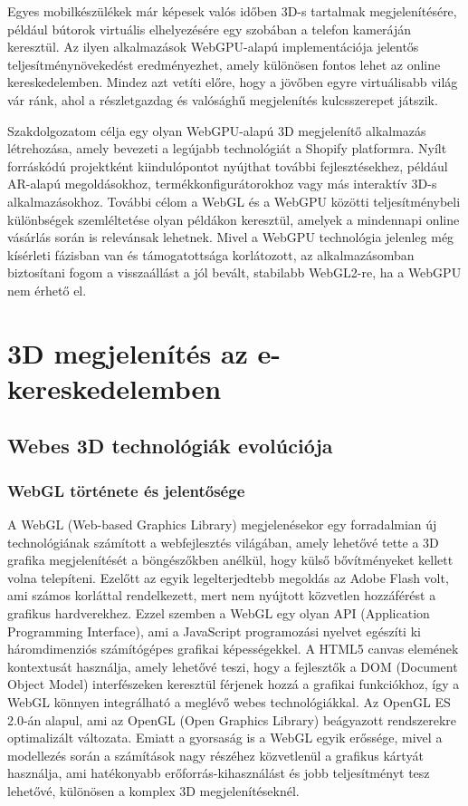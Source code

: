 \documentclass[12pt]{report}
\begin{document}
        Egyes mobilkészülékek már képesek valós időben 3D-s tartalmak megjelenítésére, például bútorok virtuális elhelyezésére egy szobában a telefon kameráján keresztül. Az ilyen alkalmazások WebGPU-alapú implementációja jelentős teljesítménynövekedést eredményezhet, amely különösen fontos lehet az online kereskedelemben. Mindez azt vetíti előre, hogy a jövőben egyre virtuálisabb világ vár ránk, ahol a részletgazdag és valósághű megjelenítés kulcsszerepet játszik.
        
        Szakdolgozatom célja egy olyan WebGPU-alapú 3D megjelenítő alkalmazás létrehozása, amely bevezeti a legújabb technológiát a Shopify platformra. Nyílt forráskódú projektként kiindulópontot nyújthat további fejlesztésekhez, például AR-alapú megoldásokhoz, termékkonfigurátorokhoz vagy más interaktív 3D-s alkalmazásokhoz. További célom a WebGL és a WebGPU közötti teljesítménybeli különbségek szemléltetése olyan példákon keresztül, amelyek a mindennapi online vásárlás során is relevánsak lehetnek. Mivel a WebGPU technológia jelenleg még kísérleti fázisban van és támogatottsága korlátozott, az alkalmazásomban biztosítani fogom a visszaállást a jól bevált, stabilabb WebGL2-re, ha a WebGPU nem érhető el.
        
	\chapter{3D megjelenítés az e-kereskedelemben}
        \section{Webes 3D technológiák evolúciója}
        \subsection{WebGL története és jelentősége}

        A WebGL (Web-based Graphics Library) megjelenésekor egy forradalmian új technológiának számított a webfejlesztés világában, amely lehetővé tette a 3D grafika megjelenítését a böngészőkben anélkül, hogy külső bővítményeket kellett volna telepíteni. Ezelőtt az egyik legelterjedtebb megoldás az Adobe Flash volt, ami számos korláttal rendelkezett, mert nem nyújtott közvetlen hozzáférést a grafikus hardverekhez. Ezzel szemben a WebGL egy olyan API (Application Programming Interface), ami a JavaScript programozási nyelvet egészíti ki háromdimenziós számítógépes grafikai képességekkel. A HTML5 canvas elemének kontextusát használja, amely lehetővé teszi, hogy a fejlesztők a DOM (Document Object Model) interfészeken keresztül férjenek hozzá a grafikai funkciókhoz, így a WebGL könnyen integrálható a meglévő webes technológiákkal. Az OpenGL ES 2.0-án alapul, ami az OpenGL (Open Graphics Library) beágyazott rendszerekre optimalizált változata. Emiatt a gyorsaság is a WebGL egyik erőssége, mivel a modellezés során a számítások nagy részéhez közvetlenül a grafikus kártyát használja, ami hatékonyabb erőforrás-kihasználást és jobb teljesítményt tesz lehetővé, különösen a komplex 3D megjelenítéseknél.
        
\end{document}
